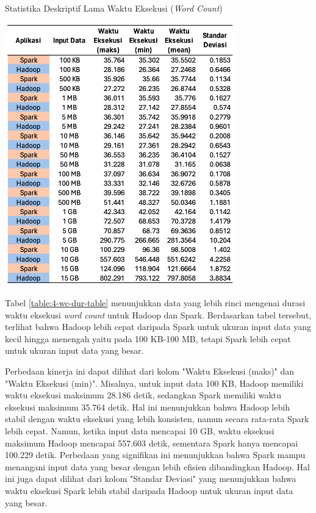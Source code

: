 \begin{table}[h]
  \centering
  \caption{Statistika Deskriptif Lama Waktu Eksekusi (\textit{Word Count})}
  \includegraphics[width=0.75\textwidth]{figures/ch04/4-wc-dur-table}
  \label{table:4-wc-dur-table}
\end{table}

Tabel \ref{table:4-wc-dur-table} menunjukkan data yang lebih rinci mengenai durasi waktu eksekusi \textit{word count} untuk Hadoop dan Spark. Berdasarkan tabel tersebut, terlihat bahwa Hadoop lebih cepat daripada Spark untuk ukuran input data yang kecil hingga menengah yaitu pada 100 KB-100 MB, tetapi Spark lebih cepat untuk ukuran input data yang besar.

Perbedaan kinerja ini dapat dilihat dari kolom "Waktu Eksekusi (maks)" dan "Waktu Eksekusi (min)". Misalnya, untuk input data 100 KB, Hadoop memiliki waktu eksekusi maksimum 28.186 detik, sedangkan Spark memiliki waktu eksekusi maksimum 35.764 detik. Hal ini menunjukkan bahwa Hadoop lebih stabil dengan waktu eksekusi yang lebih konsisten, namun secara rata-rata Spark lebih cepat. Namun, ketika input data mencapai 10 GB, waktu eksekusi maksimum Hadoop mencapai 557.603 detik, sementara Spark hanya mencapai 100.229 detik. Perbedaan yang signifikan ini menunjukkan bahwa Spark mampu menangani input data yang besar dengan lebih efisien dibandingkan Hadoop. Hal ini juga dapat dilihat dari kolom "Standar Deviasi" yang menunjukkan bahwa waktu eksekusi Spark lebih stabil daripada Hadoop untuk ukuran input data yang besar.

